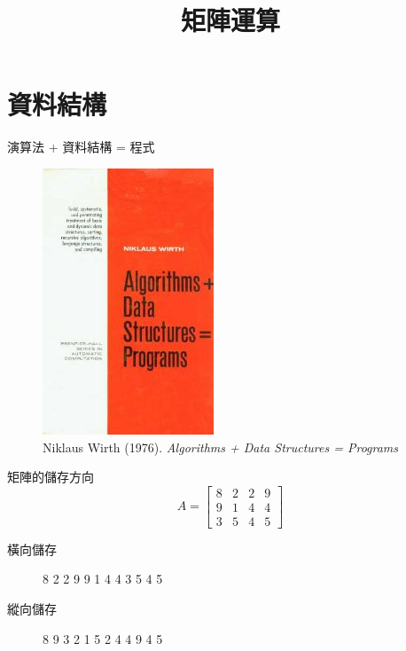 \documentclass{Amo}
\begin{document}
\title{矩陣運算}
\maketitle

\section{資料結構}
\begin{frame}{演算法 + 資料結構 = 程式}
    \begin{figure}
        \includegraphics[height=0.5\textheight]{MatrixComputations/Algorithms_+_Data_Structures.jpg}
        \caption{Niklaus Wirth (1976).  \textit{Algorithms + Data Structures = Programs}}
    \end{figure}
\end{frame}

\begin{frame}{矩陣的儲存方向}
    \[ A = \begin{bmatrix}
        8 & 2 & 2 & 9 \\
        9 & 1 & 4 & 4 \\
        3 & 5 & 4 & 5
    \end{bmatrix} \]

    \begin{description}
        \item[橫向儲存] 8 2 2 9 9 1 4 4 3 5 4 5
        \item[縱向儲存] 8 9 3 2 1 5 2 4 4 9 4 5 
    \end{description}
\end{frame}
\end{document}

